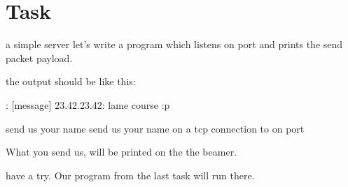 \documentclass[10pt,graphics,aspectratio=169,table]{beamer}
\begin{document}
\section{Task}
\begin{frame}[fragile]{a simple server}
let's write a program which listens on port  and prints the send packet payload.

the output should be like this:
\begin{codeblock}
: [message]
23.42.23.42: lame course :p
\end{codeblock}
\end{frame}
\begin{frame}{send us your name}
send us your name on a tcp connection to  on port 

What you send us, will be printed on the the beamer.

have a try. Our program from the last task will run there.
\end{frame}
\end{document}
